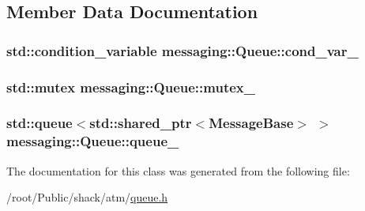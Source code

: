 \subsection{Member Data Documentation}
\hypertarget{classmessaging_1_1Queue_aec7510ebff3d15176afdf3d93ca6fdc8}{
\subsubsection[{cond\-\_\-var\-\_\-}]{\setlength{\rightskip}{0pt plus 5cm}std\-::condition\-\_\-variable messaging\-::\-Queue\-::cond\-\_\-var\-\_\-\hspace{0.3cm}{\ttfamily [private]}}}\label{classmessaging_1_1Queue_aec7510ebff3d15176afdf3d93ca6fdc8}
\hypertarget{classmessaging_1_1Queue_acb84af14fea49c09597be7ad19f9f3c5}{
\subsubsection[{mutex\-\_\-}]{\setlength{\rightskip}{0pt plus 5cm}std\-::mutex messaging\-::\-Queue\-::mutex\-\_\-\hspace{0.3cm}{\ttfamily [private]}}}\label{classmessaging_1_1Queue_acb84af14fea49c09597be7ad19f9f3c5}
\hypertarget{classmessaging_1_1Queue_aae9c5f0bc7b5be870129c56643404551}{
\subsubsection[{queue\-\_\-}]{\setlength{\rightskip}{0pt plus 5cm}std\-::queue$<$std\-::shared\-\_\-ptr$<${\bf Message\-Base}$>$ $>$ messaging\-::\-Queue\-::queue\-\_\-\hspace{0.3cm}{\ttfamily [private]}}}\label{classmessaging_1_1Queue_aae9c5f0bc7b5be870129c56643404551}


The documentation for this class was generated from the following file\-:\begin{DoxyCompactItemize}
\item 
/root/\-Public/shack/atm/\hyperlink{queue_8h}{queue.\-h}\end{DoxyCompactItemize}
